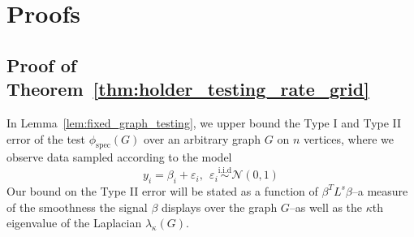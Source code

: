 \documentclass{article}
\newcommand{\1}{\mathbf{1}}
\newcommand{\spec}{\mathrm{spec}}
\theoremstyle{alden}
\theoremstyle{aldenthm}
\theoremstyle{definition}
\theoremstyle{remark}
\begin{document}
\section{Proofs}

\subsection{Proof of Theorem~\ref{thm:holder_testing_rate_grid}}

In Lemma~\ref{lem:fixed_graph_testing}, we upper bound the Type I and Type II error of the test $\phi_{\spec}(G)$ over an arbitrary graph $G$ on $n$ vertices, where we observe data sampled according to the model
\begin{equation}
\label{eqn:regression_model_fixed_graph}
y_i = \beta_i + \varepsilon_i,~~\varepsilon_i \overset{\textrm{i.i.d}}{\sim} \mathcal{N}(0,1)
\end{equation}
Our bound on the Type II error will be stated as a function of $\beta^T L^s \beta$--a measure of the smoothness the signal $\beta$ displays over the graph $G$--as well as the $\kappa$th eigenvalue of the Laplacian $\lambda_{\kappa}(G)$.
\end{document}
